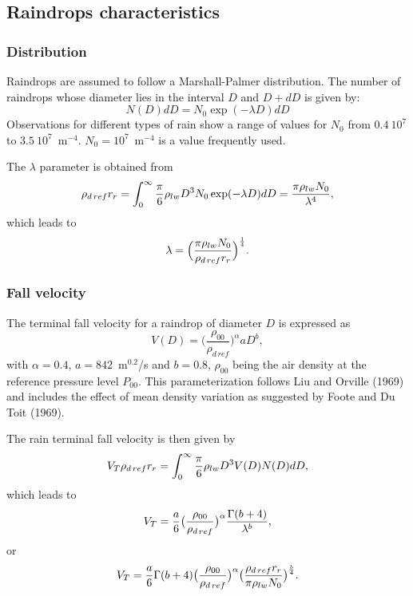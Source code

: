 \subsection{Raindrops characteristics}
\subsubsection{Distribution}
Raindrops are assumed to follow a Marshall-Palmer distribution. The number of
raindrops whose diameter lies in the interval
$D$ and $D+dD$ is given by:
\begin{equation}
N(D)dD=N_0 \exp (-\lambda D) dD
\end{equation}
Observations for different types of rain show a range of values for
$N_0$ from
$0.4\ 10^7$ to $3.5\ 10^7$~m$^{-4}$. $N_0= 10^7$~m$^{-4}$
is a value frequently used.


The $\lambda$ parameter is obtained from
\begin{equation}
 \rho_{d\,ref} r_r=\int_0^\infty {\pi \over 6} \rho_{lw} D^3 N_0 \exp(-\lambda D)dD=
{\pi \rho_{lw} N_0 \over \lambda^4},
\end{equation}
which leads to
\begin{equation}
\lambda= \Big({\pi \rho_{lw} N_0 \over \rho_{d\,ref} r_r}\Big)^{1 \over 4}.
\end{equation}
\subsubsection{Fall velocity}
The terminal fall velocity for a raindrop of diameter $D$ is expressed as
\begin{equation}
V(D)=  \big( \dfrac{ \rho_{00}}{ \rho_{d\,ref}} \big)^{\alpha} aD ^{b},
\label{eqvterm}
\end{equation}
with $\alpha=0.4$, $a=842$~m$^{0.2}$/s and $b=0.8$, $\rho_{00}$ being the air
density at the reference pressure level $P_{00}$.
This parameterization follows Liu and Orville (1969) and includes the
effect of mean density variation as suggested by Foote and Du Toit (1969).

The rain terminal fall velocity is then given by
\begin{equation}
V_T \rho_{d\,ref} r_r= \int_0^\infty {\pi \over 6} \rho_{lw} D^3 V(D) N(D)dD,
\end{equation}
which leads to
\begin{equation}
V_T = {a \over 6} \big( {\rho_{00}\over \rho_{d\,ref}}\big) ^\alpha
{\Gamma(b+4)\over \lambda ^b},
\end{equation}
or
\begin{equation}
V_T= {a \over 6} \Gamma(b+4)\big( {\rho_{00}\over \rho_{d\,ref}}\big) ^\alpha
\big( {\rho_{d\,ref} r_r \over \pi \rho_{lw} N_0}\big)
^{b \over 4}.
\label{eqvterm2}
\end{equation}
